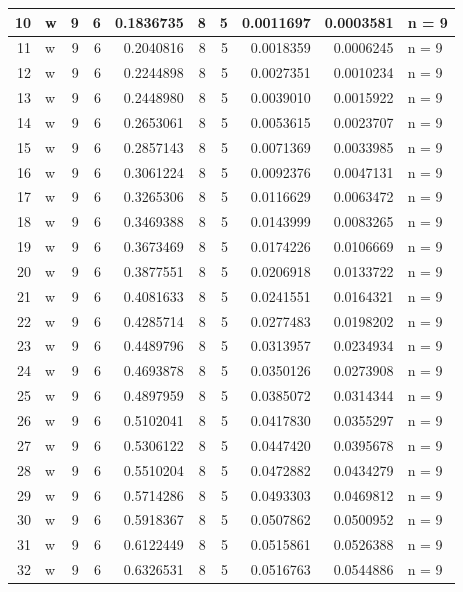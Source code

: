 \documentclass[
  letterpaper,
  DIV=11,
  numbers=noendperiod]{scrreprt}
\begin{document}
\begin{table}
\begin{tabular}[t]{r|l|r|r|r|r|r|r|r|l}
\hline
10 & w & 9 & 6 & 0.1836735 & 8 & 5 & 0.0011697 & 0.0003581 & n = 9\\
\hline
11 & w & 9 & 6 & 0.2040816 & 8 & 5 & 0.0018359 & 0.0006245 & n = 9\\
\hline
12 & w & 9 & 6 & 0.2244898 & 8 & 5 & 0.0027351 & 0.0010234 & n = 9\\
\hline
13 & w & 9 & 6 & 0.2448980 & 8 & 5 & 0.0039010 & 0.0015922 & n = 9\\
\hline
14 & w & 9 & 6 & 0.2653061 & 8 & 5 & 0.0053615 & 0.0023707 & n = 9\\
\hline
15 & w & 9 & 6 & 0.2857143 & 8 & 5 & 0.0071369 & 0.0033985 & n = 9\\
\hline
16 & w & 9 & 6 & 0.3061224 & 8 & 5 & 0.0092376 & 0.0047131 & n = 9\\
\hline
17 & w & 9 & 6 & 0.3265306 & 8 & 5 & 0.0116629 & 0.0063472 & n = 9\\
\hline
18 & w & 9 & 6 & 0.3469388 & 8 & 5 & 0.0143999 & 0.0083265 & n = 9\\
\hline
19 & w & 9 & 6 & 0.3673469 & 8 & 5 & 0.0174226 & 0.0106669 & n = 9\\
\hline
20 & w & 9 & 6 & 0.3877551 & 8 & 5 & 0.0206918 & 0.0133722 & n = 9\\
\hline
21 & w & 9 & 6 & 0.4081633 & 8 & 5 & 0.0241551 & 0.0164321 & n = 9\\
\hline
22 & w & 9 & 6 & 0.4285714 & 8 & 5 & 0.0277483 & 0.0198202 & n = 9\\
\hline
23 & w & 9 & 6 & 0.4489796 & 8 & 5 & 0.0313957 & 0.0234934 & n = 9\\
\hline
24 & w & 9 & 6 & 0.4693878 & 8 & 5 & 0.0350126 & 0.0273908 & n = 9\\
\hline
25 & w & 9 & 6 & 0.4897959 & 8 & 5 & 0.0385072 & 0.0314344 & n = 9\\
\hline
26 & w & 9 & 6 & 0.5102041 & 8 & 5 & 0.0417830 & 0.0355297 & n = 9\\
\hline
27 & w & 9 & 6 & 0.5306122 & 8 & 5 & 0.0447420 & 0.0395678 & n = 9\\
\hline
28 & w & 9 & 6 & 0.5510204 & 8 & 5 & 0.0472882 & 0.0434279 & n = 9\\
\hline
29 & w & 9 & 6 & 0.5714286 & 8 & 5 & 0.0493303 & 0.0469812 & n = 9\\
\hline
30 & w & 9 & 6 & 0.5918367 & 8 & 5 & 0.0507862 & 0.0500952 & n = 9\\
\hline
31 & w & 9 & 6 & 0.6122449 & 8 & 5 & 0.0515861 & 0.0526388 & n = 9\\
\hline
32 & w & 9 & 6 & 0.6326531 & 8 & 5 & 0.0516763 & 0.0544886 & n = 9\\

\end{tabular}
\end{table}
\end{document}
